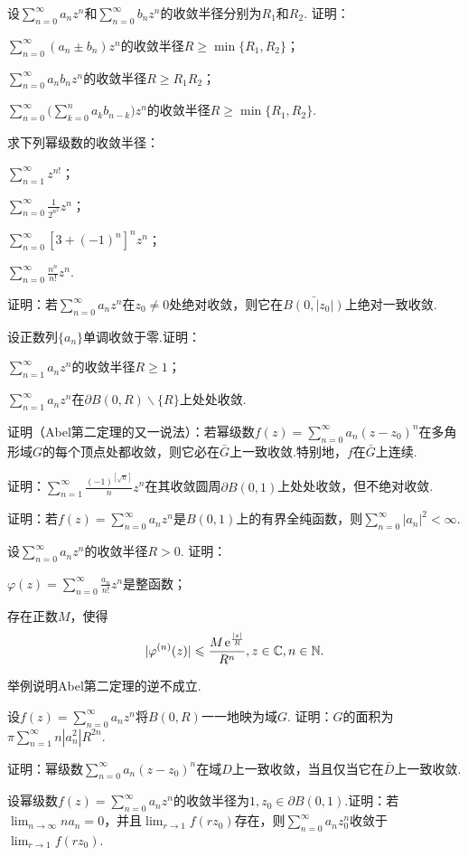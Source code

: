 \begin{xiti}
\item 设$\sum_{n=0}^\infty a_nz^n$和$\sum_{n=0}^\infty b_nz^n$的收敛半径分别为$R_1$和$R_2$. 证明：
\begin{enuma}
  \item $\sum_{n=0}^\infty(a_n\pm b_n)z^n$的收敛半径$R\ge\min\{R_1,R_2\}$；
  \item $\sum_{n=0}^\infty a_nb_nz^n$的收敛半径$R\ge R_1R_2$；
  \item $\sum_{n=0}^\infty\bigg(\sum_{k=0}^na_kb_{n-k}\bigg)z^n$的收敛半径$R\ge\min\{R_1,R_2\}$.
\end{enuma}
\item 求下列幂级数的收敛半径：
\begin{enuma}
  \item $\sum_{n=1}^\infty z^{n!}$；
  \item $\sum_{n=0}^\infty\frac1{2^{n^2}}z^n$；
  \item $\sum_{n=0}^\infty[3+(-1)^n]^nz^n$；
  \item $\sum_{n=0}^\infty\frac{n^n}{n!}z^n$.
\end{enuma}
\item 证明：若$\sum_{n=0}^\infty a_nz^n$在$z_0\ne0$处绝对收敛，则它在$\bar{B(0,|z_0|)}$上绝对一致收敛.
\item 设正数列$\{a_n\}$单调收敛于零.证明：
\begin{enuma}
  \item $\sum_{n=1}^\infty a_nz^n$的收敛半径$R\ge1$；
  \item $\sum_{n=1}^\infty a_nz^n$在$\partial B(0,R)\backslash\{R\}$上处处收敛.
\end{enuma}
\item 证明（Abel第二定理的又一说法）：若幂级数$f(z)=\sum_{n=0}^\infty a_n(z-z_0)^n$在多角形域$G$的每个顶点处都收敛，则它必在$\bar G$上一致收敛.特别地，$f$在$\bar G$上连续.
\item 证明：$\sum_{n=1}^\infty \frac{(-1)^{[\sqrt n]}}nz^n$在其收敛圆周$\partial B(0,1)$上处处收敛，但不绝对收敛.
\item 证明：若$f(z)=\sum_{n=0}^\infty a_nz^n$是$B(0,1)$上的有界全纯函数，则$\sum_{n=0}^\infty|a_n|^2<\infty$.
\item 设$\sum_{n=0}^\infty a_nz^n$的收敛半径$R>0$. 证明：
\begin{enuma}
  \item $\varphi(z)=\sum_{n=0}^\infty\frac{a_n}{n!}z^n$是整函数；
  \item 存在正数$M$，使得
  \[|\varphi^{(n)}(z)|\leqslant\frac{M\operatorname{\!\!\;\textrm e}^{\frac{|z|}R}}{R^n},z\in\mathbb C,n\in\mathbb N.\]
\end{enuma}
\item 举例说明Abel第二定理的逆不成立.
\item 设$f(z)=\sum_{n=0}^\infty a_nz^n$将$B(0,R)$一一地映为域$G$. 证明：$G$的面积为$\pi\sum_{n=1}^\infty n|a_n^2|R^{2n}$.
\item 证明：幂级数$\sum_{n=0}^\infty a_n(z-z_0)^n$在域$D$上一致收敛，当且仅当它在$\bar D$上一致收敛.
\item 设幂级数$f(z)=\sum_{n=0}^\infty a_nz^n$的收敛半径为$1,z_0\in\partial B(0,1)$.证明：若$\lim_{n\to\infty}na_n=0$，并且$\lim_{r\to1}f(rz_0)$存在，则$\sum_{n=0}^\infty a_nz_0^n$收敛于$\lim_{r\to1}f(rz_0)$.
\end{xiti}

